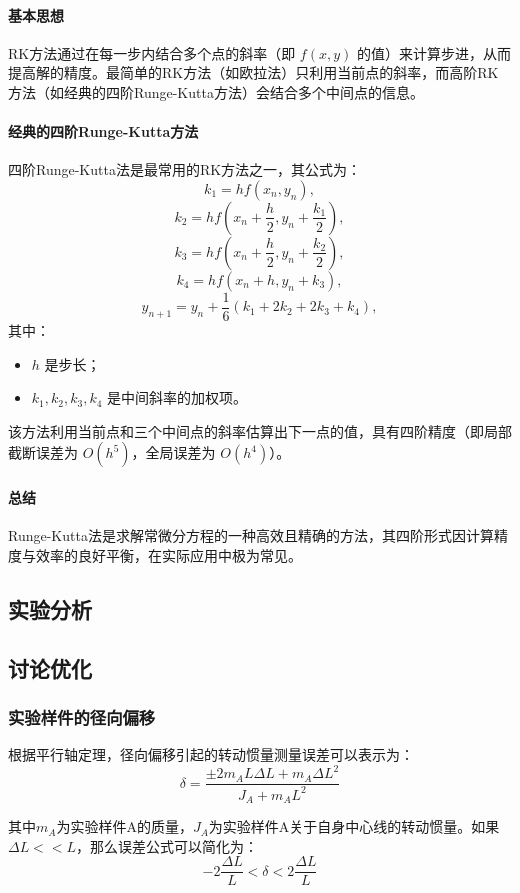 \documentclass[12pt,hyperref,a4paper,UTF8]{ctexart}
\begin{document}
\begin{itemize}
\paragraph{基本思想}
RK方法通过在每一步内结合多个点的斜率（即 \( f(x, y) \) 的值）来计算步进，从而提高解的精度。最简单的RK方法（如欧拉法）只利用当前点的斜率，而高阶RK方法（如经典的四阶Runge-Kutta方法）会结合多个中间点的信息。

\paragraph{经典的四阶Runge-Kutta方法}
四阶Runge-Kutta法是最常用的RK方法之一，其公式为：
\[
k_1 = h f(x_n, y_n),
\]
\[
k_2 = h f\left(x_n + \frac{h}{2}, y_n + \frac{k_1}{2}\right),
\]
\[
k_3 = h f\left(x_n + \frac{h}{2}, y_n + \frac{k_2}{2}\right),
\]
\[
k_4 = h f(x_n + h, y_n + k_3),
\]
\[
y_{n+1} = y_n + \frac{1}{6}(k_1 + 2k_2 + 2k_3 + k_4),
\]
其中：
\begin{itemize}
    \item \( h \) 是步长；
    \item \( k_1, k_2, k_3, k_4 \) 是中间斜率的加权项。
\end{itemize}

该方法利用当前点和三个中间点的斜率估算出下一点的值，具有四阶精度（即局部截断误差为 \( O(h^5) \)，全局误差为 \( O(h^4) \)）。

\paragraph{总结}
Runge-Kutta法是求解常微分方程的一种高效且精确的方法，其四阶形式因计算精度与效率的良好平衡，在实际应用中极为常见。


\subsection{实验分析}


\subsection{讨论优化}
\subsubsection{实验样件的径向偏移}
根据平行轴定理，径向偏移引起的转动惯量测量误差可以表示为：
$$ \delta=\frac{\pm 2m_AL\Delta L+m_A\Delta L^2}{J_A+m_AL^2} $$

其中$m_A$为实验样件A的质量，$J_A$为实验样件A关于自身中心线的转动惯量。如果$\Delta L<<L$，那么误差公式可以简化为：
$$ -2\frac{\Delta L}{L}<\delta<2\frac{\Delta L}{L} $$

\end{itemize}
\end{document}
